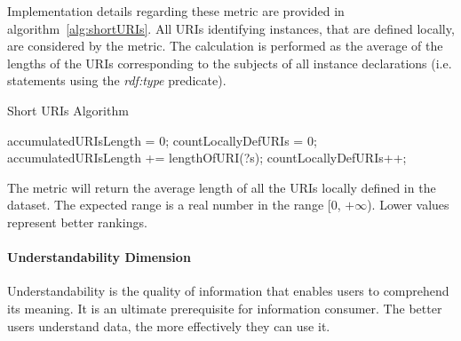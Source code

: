 Implementation details regarding these metric are provided in algorithm~\ref{alg:shortURIs}. All URIs identifying instances, that are defined locally, are considered by the metric. The calculation is performed as the average of the lengths of the URIs corresponding to the subjects of all instance declarations (i.e. statements using the \textit{rdf:type} predicate).
\begin{algorithm}
\caption{Short URIs Algorithm} \label{alg:shortURIs}
\begin{algorithmic}[1]
\State accumulatedURIsLength = 0;
\State countLocallyDefURIs = 0;
\EndProcedure
{}
\State accumulatedURIsLength += lengthOfURI(?s);
\State countLocallyDefURIs++;
\EndIf ~\\
\EndProcedure
\end{algorithmic}
\end{algorithm}
The metric will return the average length of all the URIs locally defined in the dataset. The expected range is a real number in the range [0, $+\infty$). Lower values represent better rankings.


\paragraph{Understandability Dimension}
Understandability is the quality of information that enables users to comprehend its meaning. 
It is an ultimate prerequisite for information consumer. 
The better users understand data, the more effectively they can use it. 


